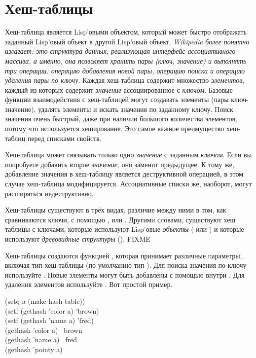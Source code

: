 \else

\chapter{Хеш-таблицы}
\label{HASH}

Хеш-таблица является Lisp'овыми объектом, который может быстро отображать
заданный Lisp'овый объект в другой Lisp'овый объект. 
\emph{Wikipedia более понятно излагает: это структура данных, реализующая интерфейс
ассоциативного массива, а именно, она позволяет хранить пары (ключ, значение) и
выполнять три операции: операцию добавления новой пары, операцию поиска и
операцию удаления пары по ключу.}
Каждая хеш-таблица содержит множество \emph{элементов}, каждый из которых
содержит \emph{значение} ассоциированное с \emph{ключом}. Базовые функции
взаимодействия с хеш-таблицей могут создавать элементы (пары ключ-значение),
удалять элементы и искать значения по заданному ключу. Поиск значения очень
быстрый, даже при наличии большого количества элементов, потому что используется
хеширование. Это самое важное преимущество хеш-таблиц перед списками свойств.

Хеш-таблица может связывать только одно \emph{значение} с заданным
\emph{ключом}. Если вы попробуете добавить второе \emph{значение}, оно заменит
предыдущее. К тому же, добавление значения в хеш-таблицу является деструктивной
операцией, в этом случае хеш-таблица модифицируется. Ассоциативные списки же,
наоборот, могут расширяться недеструктивно.

Хеш-таблицы существуют в трёх видах, различие между ними в том, как сравниваются
ключи, с помощью ,  или . Другими словами,
существуют хеш таблицы с ключами, которые используют Lisp'овые \emph{объекты}
( или ) и которые используют \emph{древовидные структуры}
(). FIXME

Хеш-таблицы создаются функцией , которая принимает
различные параметры, включая тип хеш-таблицы (по-умолчанию тип ).
Для поиска значения по ключу используйте .
Новые элементы могут быть добавлены с помощью  внутри .
Для удаления элементов используйте . Вот простой пример.
\begin{lisp}
(setq a (make-hash-table)) \\
(setf (gethash 'color a) 'brown) \\
(setf (gethash 'name a) 'fred) \\
(gethash 'color a) \EV\ brown \\
(gethash 'name a) \EV\ fred \\
(gethash 'pointy a) \EV\ {\false}
\end{lisp}

